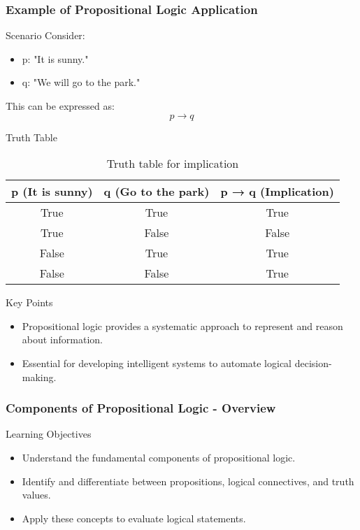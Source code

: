 \documentclass[aspectratio=169]{beamer}
\begin{document}
\begin{frame}[fragile]
    \frametitle{Example of Propositional Logic Application}
    \begin{block}{Scenario}
        Consider:
        \begin{itemize}
            \item p: "It is sunny."
            \item q: "We will go to the park."
        \end{itemize}
        This can be expressed as: 
        \[
        p \rightarrow q
        \]
    \end{block}

    \begin{block}{Truth Table}
        \begin{table}[h]
            \centering
            \begin{tabular}{|c|c|c|}
                \hline
                p (It is sunny) & q (Go to the park) & p → q (Implication) \\
                \hline
                True  & True   & True   \\
                True  & False  & False  \\
                False & True   & True   \\
                False & False  & True   \\
                \hline
            \end{tabular}
            \caption{Truth table for implication}
        \end{table}
    \end{block}

    \begin{block}{Key Points}
        \begin{itemize}
            \item Propositional logic provides a systematic approach to represent and reason about information.
            \item Essential for developing intelligent systems to automate logical decision-making.
        \end{itemize}
    \end{block}
\end{frame}

\begin{frame}[fragile]
    \frametitle{Components of Propositional Logic - Overview}
    \begin{block}{Learning Objectives}
        \begin{itemize}
            \item Understand the fundamental components of propositional logic.
            \item Identify and differentiate between propositions, logical connectives, and truth values.
            \item Apply these concepts to evaluate logical statements.
        \end{itemize}
    \end{block}
\end{frame}
\end{document}
